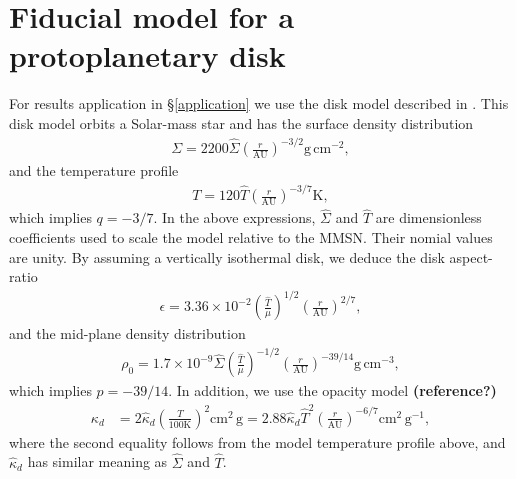 \section{Fiducial model for a protoplanetary disk}\label{mmsn}
For results application in \S\ref{application} we use the disk model
described in \cite{chiang10}. This disk model orbits a Solar-mass star and 
has the surface density distribution
\begin{align}\label{mmsn_sigma}
  \Sigma = 2200
  \hat{\Sigma}\left(\frac{r}{\mathrm{AU}}\right)^{-3/2}\mathrm{g}\,\mathrm{cm}^{-2},  
\end{align}
and the temperature profile
\begin{align}\label{mmsn_temp}
  T = 120\hat{T}\left(\frac{r}{\mathrm{AU}}\right)^{-3/7} \mathrm{K},
\end{align}
which implies $q=-3/7$. In the above expressions, $\hat{\Sigma}$ and
$\hat{T}$ are dimensionless coefficients used to scale the model
relative to the MMSN. Their nomial values are unity. By assuming a
vertically isothermal disk, we deduce the disk aspect-ratio 
\begin{align}\label{mmsn_epsilon}
  \epsilon =
  3.36\times10^{-2}\left(\frac{\hat{T}}{\mu}\right)^{1/2}\left(\frac{r}{\mathrm{AU}}\right)^{2/7}, 
\end{align}
and the mid-plane density distribution 
\begin{align}
\rho_0 = 1.7\times10^{-9}
  \hat{\Sigma}\left(\frac{\hat{T}}{\mu}\right)^{-1/2}\left(\frac{r}{\mathrm{AU}}\right)^{-39/14}\mathrm{g}\,\mathrm{cm}^{-3},
\end{align}
which implies $p=-39/14$. 
In addition, we
use the opacity model {\bf(reference?)}
 \begin{align}
   \kappa_d &= 2 \hat{\kappa}_d \left(\frac{T}{100\mathrm{K}}\right)^2
   \mathrm{cm}^2\,\mathrm{g}
    =
   2.88\hat{\kappa}_d\hat{T}^2\left(\frac{r}{\mathrm{AU}}\right)^{-6/7}\mathrm{cm}^2\,\mathrm{g}^{-1},   
 \end{align}
where the second equality follows from the model temperature profile
above, and $\hat{\kappa}_d$ has similar meaning as $\hat{\Sigma}$ and
$\hat{T}$. 
